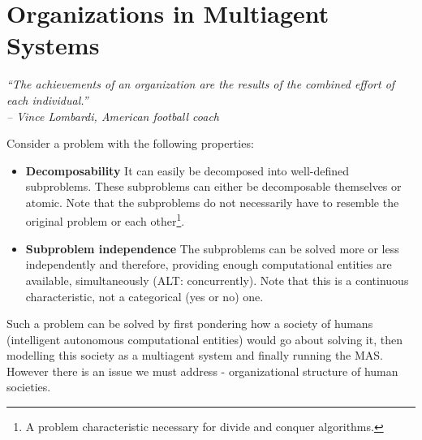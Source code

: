 
\chapter{Organizations in Multiagent Systems}

\begin{flushright}
\textit{``The achievements of an organization are the results of the combined effort of each individual.''}\\
\textit{-- Vince Lombardi, American football coach}
\end{flushright}

Consider a problem with the following properties:
\begin{itemize}
	\item \textbf{Decomposability} It can easily be decomposed into well-defined subproblems. These subproblems can either be decomposable themselves or atomic.
	Note that the subproblems do not necessarily have to resemble the original problem or each other\footnote{A problem characteristic necessary for divide and conquer algorithms.}. 
	\item \textbf{Subproblem independence} The subproblems can be solved more or less independently and therefore, providing enough computational entities are available, simultaneously (ALT: concurrently).
	Note that this is a continuous characteristic, not a categorical (yes or no) one.
\end{itemize}

Such a problem can be solved by first pondering how a society of humans (intelligent autonomous computational entities) would go about solving it, then modelling this society as a multiagent system and finally running the MAS.
However there is an issue we must address - organizational structure of human societies.

